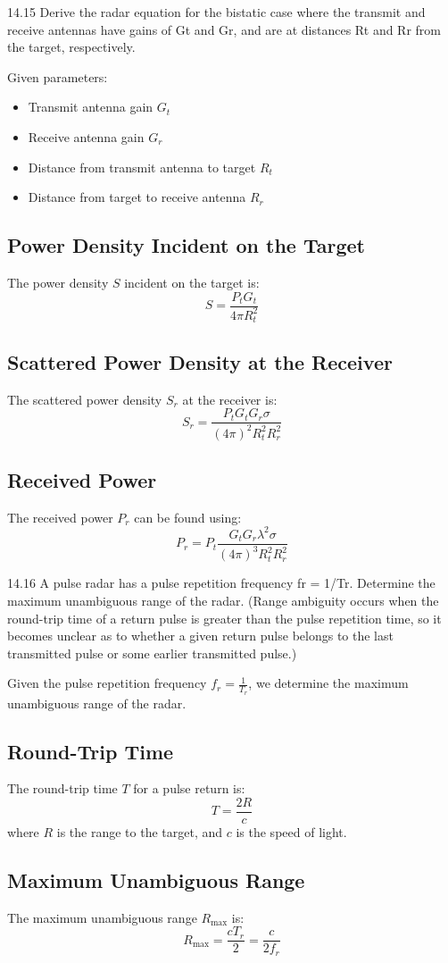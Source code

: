 \documentclass[cn,12pt]{homework}
\begin{document}
14.15 Derive the radar equation for the bistatic case where the transmit and receive antennas have gains of
Gt and Gr, and are at distances Rt and Rr from the target, respectively.

\begin{solution}
  Given parameters:
\begin{itemize}
    \item Transmit antenna gain \( G_t \)
    \item Receive antenna gain \( G_r \)
    \item Distance from transmit antenna to target \( R_t \)
    \item Distance from target to receive antenna \( R_r \)
\end{itemize}

\subsection*{Power Density Incident on the Target}
The power density \( S \) incident on the target is:
\[ S = \frac{P_t G_t}{4\pi R_t^2} \]

\subsection*{Scattered Power Density at the Receiver}
The scattered power density \( S_r \) at the receiver is:
\[ S_r = \frac{P_t G_t G_r \sigma}{(4\pi)^2 R_t^2 R_r^2} \]

\subsection*{Received Power}
The received power \( P_r \) can be found using:
\[ P_r = P_t \frac{G_t G_r \lambda^2 \sigma}{(4\pi)^3 R_t^2 R_r^2} \]

\end{solution}
\newpage

14.16 A pulse radar has a pulse repetition frequency fr = 1/Tr. Determine the maximum unambiguous
range of the radar. (Range ambiguity occurs when the round-trip time of a return pulse is greater than
the pulse repetition time, so it becomes unclear as to whether a given return pulse belongs to the last
transmitted pulse or some earlier transmitted pulse.)
\begin{solution}
  Given the pulse repetition frequency \( f_r = \frac{1}{T_r} \), we determine the maximum unambiguous range of the radar.

\subsection*{Round-Trip Time}
The round-trip time \( T \) for a pulse return is:
\[ T = \frac{2R}{c} \]
where \( R \) is the range to the target, and \( c \) is the speed of light.

\subsection*{Maximum Unambiguous Range}
The maximum unambiguous range \( R_{\text{max}} \) is:
\[ R_{\text{max}} = \frac{cT_r}{2} = \frac{c}{2f_r} \]
\end{solution}
\newpage
\end{document}
